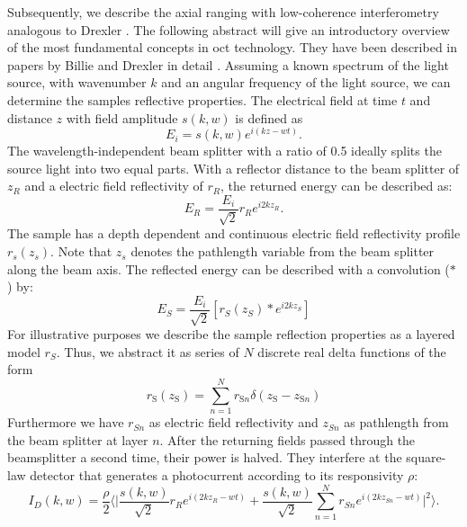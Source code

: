 Subsequently, we describe the axial ranging with low-coherence interferometry analogous to Drexler \cite{Drexler.2008}. The following abstract will give an introductory overview of the most fundamental concepts in \acrshort{oct} technology. They have been described in papers by Billie and Drexler in detail \cite{Bille.2019, Drexler.2008}. Assuming a known spectrum of the light source, with wavenumber \( k \) and an angular frequency of the light source, we can determine the samples reflective properties. The electrical field at time \( t \) and distance \( z \) with field amplitude \( s(k,w) \) is defined as
\begin{equation}
    E_i = s(k,w)e^{i(kz-wt)}.
    \label{eq:energylightsource}
\end{equation}
The wavelength-independent beam splitter with a ratio of 0.5 ideally splits the source light into two equal parts. With a reflector distance to the beam splitter of \( z_R \) and a electric field reflectivity of \( r_R \), the returned energy can be described as:
\begin{equation}
    E_R = \frac{E_i}{\sqrt{2}}r_R e^{i2kz_R}.
    \label{eq:energyreflector}
\end{equation}
The sample has a depth dependent and continuous electric field reflectivity profile \( r_s(z_s) \). Note that \( z_s \) denotes the pathlength variable from the beam splitter along the beam axis. The reflected energy can be described with a convolution (\( * \)) by:
\begin{equation}
    E_S = \frac{E_i}{\sqrt{2}} \left[ r_S(z_S) * e^{i2kz_S} \right]
    \label{eq:energysample}
\end{equation}
For illustrative purposes we describe the sample reflection properties as a layered model \( r_S \). Thus, we abstract it as series of \( N \) discrete real delta functions of the form
\begin{equation}
r_{\mathrm{S}}\left(z_{\mathrm{S}}\right)=\sum_{n=1}^{N} r_{\mathrm{S} n} \delta\left(z_{\mathrm{S}}-z_{\mathrm{S} n}\right)
\label{eq:layered}
\end{equation}
Furthermore we have \( r_{Sn} \) as electric field reflectivity and \( z_{Sn} \) as pathlength from the beam splitter at layer \( n \). After the returning fields passed through the beamsplitter a second time, their power is halved. They interfere at the square-law detector that generates a photocurrent according to its responsivity \( \rho \):
\begin{equation}
    I_D(k,w) = \frac{\rho}{2}\bigg\langle \bigg| \frac{s(k,w)}{\sqrt{2}}r_R e^{i(2kz_R-wt)} + \frac{s(k,w)}{\sqrt{2}} \sum^N_{n=1}r_{Sn}e^{i(2kz_{Sn}-wt)} \bigg|^2 \bigg \rangle .
    \label{eq:msf}
\end{equation}
